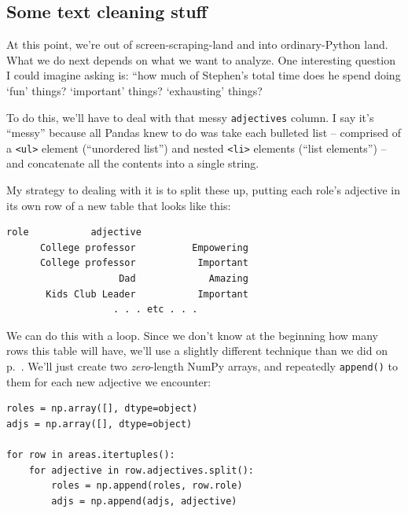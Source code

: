 \subsection{Some text cleaning stuff}

At this point, we're out of screen-scraping-land and into ordinary-Python land.
What we do next depends on what we want to analyze. One interesting question I
could imagine asking is: ``how much of Stephen's total time does he spend doing
`fun' things? `important' things? `exhausting' things?


To do this, we'll have to deal with that messy \texttt{adjectives} column. I
say it's ``messy'' because all Pandas knew to do was take each bulleted list
-- comprised of a \texttt{<ul>} element (``unordered list'') and nested
\texttt{<li>} elements (``list elements'') -- and concatenate all the contents
into a single string.

My strategy to dealing with it is to split these up, putting each role's
adjective in its own row of a new table that looks like this:

\begin{Verbatim}[fontsize=\small,samepage=true,frame=leftline,framesep=5mm,framerule=1mm]
                   role           adjective
      College professor          Empowering
      College professor           Important
                    Dad             Amazing
       Kids Club Leader           Important
                   . . . etc . . .
\end{Verbatim}


We can do this with a loop. Since we don't know at the beginning how many rows
this table will have, we'll use a slightly different technique than we did on
p.~\pageref{objectDtype}. We'll just create two \textit{zero}-length NumPy
arrays, and repeatedly \texttt{append()} to them for each new adjective we
encounter:

\begin{Verbatim}[fontsize=\small,samepage=true,frame=single,framesep=3mm]
roles = np.array([], dtype=object)
adjs = np.array([], dtype=object)

for row in areas.itertuples():
    for adjective in row.adjectives.split():
        roles = np.append(roles, row.role)
        adjs = np.append(adjs, adjective)
\end{Verbatim}

